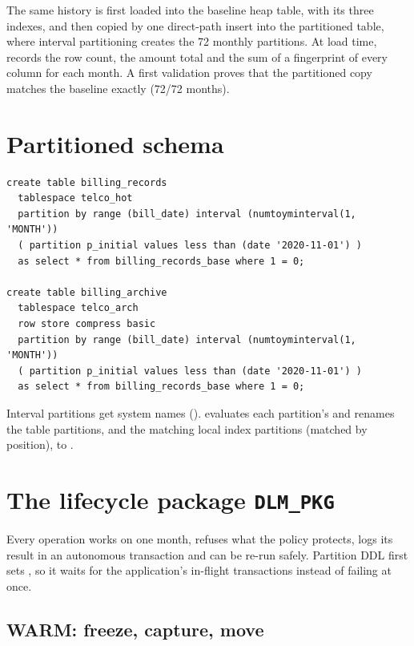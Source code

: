 The same history is first loaded into the baseline heap table, with its three indexes, and
then copied by one direct-path insert into the partitioned table, where interval partitioning
creates the 72 monthly partitions. At load time,  records the
row count, the amount total and the sum of a fingerprint of every column for each month. A
first validation proves that the partitioned copy matches the baseline exactly (72/72 months).

\section{Partitioned schema}

\needspace{0.3\textheight}
\begin{lstlisting}[style=sql, caption={Partitioned and archive tables (excerpt of \code{03\_billing\_tables.sql})}]
create table billing_records
  tablespace telco_hot
  partition by range (bill_date) interval (numtoyminterval(1, 'MONTH'))
  ( partition p_initial values less than (date '2020-11-01') )
  as select * from billing_records_base where 1 = 0;

create table billing_archive
  tablespace telco_arch
  row store compress basic
  partition by range (bill_date) interval (numtoyminterval(1, 'MONTH'))
  ( partition p_initial values less than (date '2020-11-01') )
  as select * from billing_records_base where 1 = 0;
\end{lstlisting}

Interval partitions get system names ().
 evaluates each partition's  and renames the
table partitions, and the matching local index partitions (matched by position), to
.

\section{The lifecycle package \texttt{DLM\_PKG}}

Every operation works on one month, refuses what the policy protects, logs its result in an
autonomous transaction and can be re-run safely. Partition DDL first sets
, so it waits for the application's in-flight transactions
instead of failing at once.

\subsection{WARM: freeze, capture, move}


